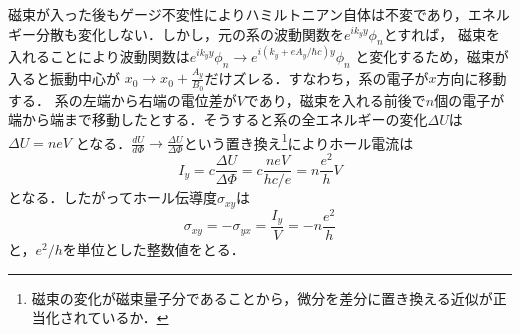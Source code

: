 \documentclass[]{jsarticle}
\begin{document}
磁束が入った後もゲージ不変性によりハミルトニアン自体は不変であり，エネルギー分散も変化しない．しかし，元の系の波動関数を$e^{ik_y y}\phi_n$とすれば，
磁束を入れることにより波動関数は$e^{ik_y y} \phi_n \to e^{i(k_y + eA_y /\hbar c)y} \phi_n $ と変化するため，磁束が入ると振動中心が
$\displaystyle x_0 \to x_0 + \frac{A_y}{B_0} $だけズレる．すなわち，系の電子が$x$方向に移動する．
系の左端から右端の電位差が$V$であり，磁束を入れる前後で$n$個の電子が端から端まで移動したとする．そうすると系の全エネルギーの変化$\Delta U$は$\Delta U = neV$
となる．$\displaystyle \frac{dU}{d\Phi} \to \frac{\Delta U}{ \Delta \Phi}$という置き換え\footnote{磁束の変化が磁束量子分であることから，微分を差分に置き換える近似が正当化されているか．}によりホール電流は
\begin{equation}
    I_y = c\frac{\Delta U}{\Delta \Phi} = c\frac{neV}{hc/e} = n \frac{e^2}{h} V
\end{equation}
となる．したがってホール伝導度$\sigma_{xy}$は
\begin{equation}
    \sigma_{xy} = -\sigma_{yx} = \frac{I_y}{V} = -n\frac{e^2}{h}
\end{equation}
と，$e^2/h$を単位とした整数値をとる．

\end{document}

